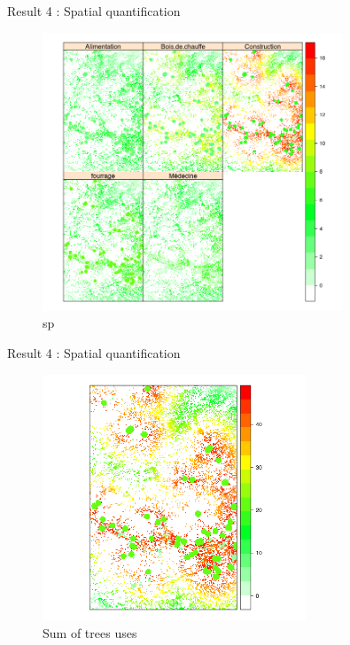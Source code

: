 \documentclass[newPxFont]{beamer}
\begin{document}
\begin{frame}[c]{Result 4 : Spatial quantification}
\vspace{-1cm}
\begin{figure}
  \centering
  \includegraphics[width = 0.8\textwidth]{img/usages_sp_distances}
  \caption{sp}
\end{figure}

\end{frame}\begin{frame}[c]{Result 4 : Spatial quantification}
\vspace{-1cm}
\begin{figure}
  \centering
  \includegraphics[width = 0.7\textwidth]{img/sum_use_sp}
  \caption{Sum of trees uses}
\end{figure}

\end{frame}
\end{document}
